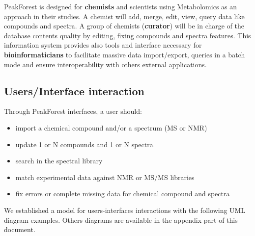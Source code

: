 PeakForest is designed for \textbf{chemists} and scientists using Metabolomics as an approach in their studies. A chemist will add, merge, edit, view, query data like compounds and spectra. A group of chemists (\textbf{curator}) will be in charge of the database contents quality by editing, fixing compounds and spectra features.
This information system provides also tools and interface necessary for \textbf{bioinformaticians} to facilitate massive data import/export, queries in a batch mode and ensure interoperability with others external applications.


\subsection{Users/Interface interaction}

Through PeakForest interfaces, a user should:
\begin{itemize}
	\item import a chemical compound and/or a spectrum (MS or NMR)
	\item update 1 or N compounds and 1 or N spectra
	\item search in the spectral library
	\item match experimental data against NMR  or MS/MS libraries
	\item fix errors or complete missing data for chemical compound and spectra
\end{itemize}

We established a model for users-interfaces interactions with the following UML diagram examples. Others diagrams are available in the appendix part of this document.


